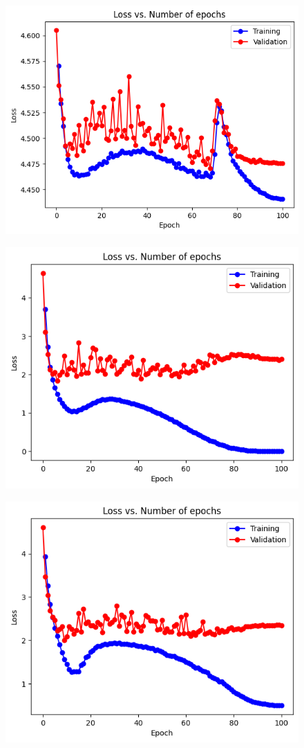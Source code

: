 \documentclass{article}
\begin{document}
\begin{figure}[h]
\centering
\begin{minipage}{.5\textwidth}
  \centering
  \includegraphics[width=.6\linewidth]{assets/gumbel_softmax_le.png}
  \newline
  \noindent
  \label{fig:test1}
\end{minipage}%
\begin{minipage}{.5\textwidth}
  \centering
  \includegraphics[width=.6\linewidth]{assets/log_gumbel_softmax_le.png}
  \newline
  \noindent
  \label{fig:test2}
\end{minipage}
\end{figure}
\begin{figure}[h]
\centering
\begin{minipage}{.5\textwidth}
  \centering
  \includegraphics[width=.6\linewidth]{assets/log_taylor_softmax_le.png}
  \newline
  \noindent
  \label{fig:test2}
\end{minipage}
\end{figure}
\end{document}
